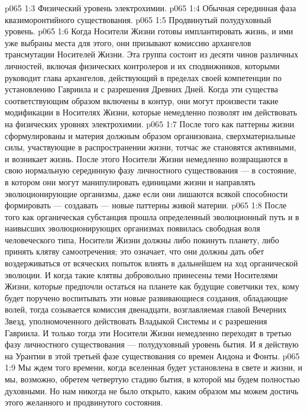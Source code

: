 \vs p065 1:3 \bibnobreakspace Физический уровень электрохимии.
\vs p065 1:4 \bibnobreakspace Обычная серединная фаза квазиморонтийного существования.
\vs p065 1:5 \bibnobreakspace Продвинутый полудуховный уровень.
\vs p065 1:6 \pc Когда Носители Жизни готовы имплантировать жизнь, и ими уже выбраны места для этого, они призывают комиссию архангелов трансмутации Носителей Жизни. Эта группа состоит из десяти чинов различных личностей, включая физических контролеров и их сподвижников, которыми руководит глава архангелов, действующий в пределах своей компетенции по установлению Гавриила и с разрешения Древних Дней. Когда эти существа соответствующим образом включены в контур, они могут произвести такие модификации в Носителях Жизни, которые немедленно позволят им действовать на физических уровнях электрохимии.
\vs p065 1:7 После того как паттерны жизни сформулированы и материя должным образом организована, сверхматериальные силы, участвующие в распространении жизни, тотчас же становятся активными, и возникает жизнь. После этого Носители Жизни немедленно возвращаются в свою нормальную серединную фазу личностного существования --- в состояние, в котором они могут манипулировать единицами жизни и направлять эволюционирующие организмы, даже если они лишаются всякой способности формировать --- создавать --- новые паттерны живой материи.
\vs p065 1:8 После того как органическая субстанция прошла определенный эволюционный путь и в наивысших эволюционирующих организмах появилась свободная воля человеческого типа, Носители Жизни должны либо покинуть планету, либо принять клятву самоотречения; это означает, что они должны дать обет воздерживаться от всяческих попыток влиять в дальнейшем на ход органической эволюции. И когда такие клятвы добровольно принесены теми Носителями Жизни, которые предпочли остаться на планете как будущие советчики тех, кому будет поручено воспитывать эти новые развивающиеся создания, обладающие волей, тогда созывается комиссия двенадцати, возглавляемая главой Вечерних Звезд, уполномоченного действовать Владыкой Системы и с разрешения Гавриила. И только тогда эти Носители Жизни немедленно переходят в третью фазу личностного существования --- полудуховный уровень бытия. И я действую на Урантии в этой третьей фазе существования со времен Андона и Фонты.
\vs p065 1:9 Мы ждем того времени, когда вселенная будет установлена в свете и жизни, и мы, возможно, обретем четвертую стадию бытия, в которой мы будем полностью духовными. Но нам никогда не было открыто, каким образом мы можем достичь этого желанного и продвинутого состояния.
